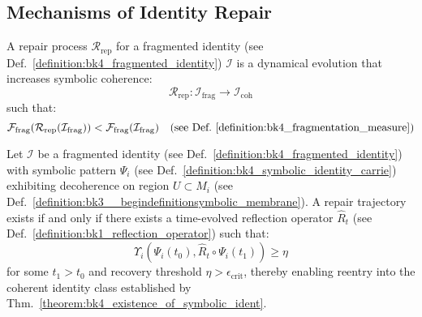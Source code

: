 \subsection{Mechanisms of Identity Repair} \label{subsec:bk4_mechanisms_identity_repair}
\begin{definition} \label{definition:bk4_repair_process}
A repair process $\mathcal{R}_{\text{rep}}$ for a fragmented identity (see Def.~\ref{definition:bk4_fragmented_identity}) $\mathcal{I}$ is a dynamical evolution that increases symbolic coherence:
\begin{equation}
    \mathcal{R}_{\text{rep}}: \mathcal{I}_{\text{frag}} \to \mathcal{I}_{\text{coh}}
\end{equation}
such that:
\begin{equation}
    \mathcal{F}_{\text{frag}}(\mathcal{R}_{\text{rep}}(\mathcal{I}_{\text{frag}})) < \mathcal{F}_{\text{frag}}(\mathcal{I}_{\text{frag}}) \quad \text{(see Def.~\ref{definition:bk4_fragmentation_measure})}
\end{equation}
\end{definition}
\begin{theorem} \label{theorem:bk4_reflective_reentry}
Let $\mathcal{I}$ be a fragmented identity (see Def.~\ref{definition:bk4_fragmented_identity}) with symbolic pattern $\Psi_i$ 
(see Def.~\ref{definition:bk4_symbolic_identity_carrie}) exhibiting decoherence on region $U \subset M_i$ (see Def.~\ref{definition:bk3__begindefinitionsymbolic_membrane}). 
A repair trajectory exists if and only if there exists a time-evolved reflection operator $\widehat{R}_t$ (see Def.~\ref{definition:bk1_reflection_operator}) such that:
\begin{equation}
    \Upsilon_i(\Psi_i(t_0), \widehat{R}_t \circ \Psi_i(t_1)) \geq \eta
\end{equation}
for some $t_1 > t_0$ and recovery threshold $\eta > \epsilon_{\text{crit}}$, thereby enabling reentry into the coherent identity class established by Thm.~\ref{theorem:bk4_existence_of_symbolic_ident}.
\end{theorem}
